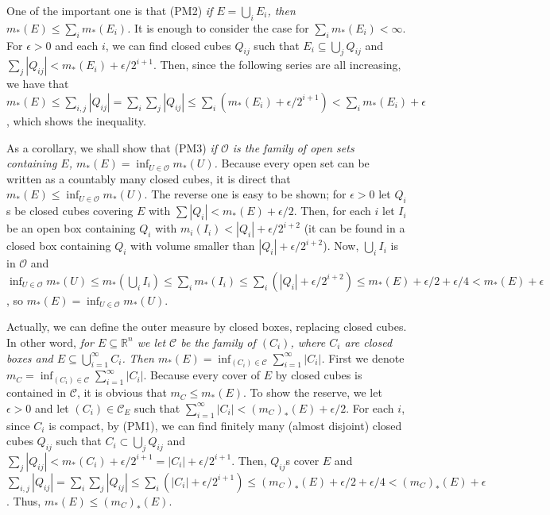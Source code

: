 \documentclass{article}
\newcommand{\ReR}{\mathbb{R}}
\begin{document}
One of the important one is that (PM2) \textit{if $E = \bigcup_i E_i$, then $m_*(E) \le \sum_i m_*(E_i)$.}
It is enough to consider the case for $\sum_i m_*(E_i) < \infty$.
For $\epsilon > 0$ and each $i$, we can find closed cubes $Q_{ij}$ such that $E_i \subseteq \bigcup_j Q_{ij}$ and $\sum_j |Q_{ij}| < m_*(E_i) + \epsilon / 2^{i + 1}$.
Then, since the following series are all increasing, we have that $m_*(E) \le \sum_{i, j} |Q_{ij}| = \sum_i \sum_j |Q_{ij}| \le \sum_i (m_*(E_i) + \epsilon / 2^{i + 1}) < \sum_i m_*(E_i) + \epsilon$, which shows the inequality.

As a corollary, we shall show that (PM3) \textit{if $\mathcal{O}$ is the family of open sets containing $E$, $m_*(E) = \inf_{U \in \mathcal{O}} m_*(U)$.}
Because every open set can be written as a countably many closed cubes, it is direct that $m_*(E) \le \inf_{U \in \mathcal{O}} m_*(U)$.
The reverse one is easy to be shown; for $\epsilon > 0$ let $Q_i$s be closed cubes covering $E$ with $\sum |Q_i| < m_*(E) + \epsilon / 2$.
Then, for each $i$ let $I_i$ be an open box containing $Q_i$ with $m_i(I_i) < |Q_i| + \epsilon / 2^{i + 2}$ (it can be found in a closed box containing $Q_i$ with volume smaller than $|Q_i| + \epsilon / 2^{i + 2}$).
Now, $\bigcup_i I_i$ is in $\mathcal{O}$ and $\inf_{U \in \mathcal{O}} m_*(U) \le m_*(\bigcup_i I_i) \le \sum_i m_*(I_i) \le \sum_i (|Q_i| + \epsilon / 2^{i + 2}) \le m_*(E) + \epsilon / 2 + \epsilon / 4 < m_*(E) + \epsilon$, so $m_*(E) = \inf_{U \in \mathcal{O}} m_*(U)$.

Actually, we can define the outer measure by closed boxes, replacing closed cubes.
In other word, \textit{for $E \subseteq \ReR^n$ we let $\mathcal{C}$ be the family of $(C_i)$, where $C_i$ are closed boxes and $E \subseteq \bigcup_{i = 1}^\infty C_i$.}
\textit{Then $m_*(E) = \inf_{(C_i) \in \mathcal{C}} \sum_{i = 1}^\infty |C_i|$.}
First we denote $m_C = \inf_{(C_i) \in \mathcal{C}} \sum_{i = 1}^\infty |C_i|$.
Because every cover of $E$ by closed cubes is contained in $\mathcal{C}$, it is obvious that $m_C \le m_*(E)$.
To show the reserve, we let $\epsilon > 0$ and let $(C_i) \in \mathcal{C}_E$ such that $\sum_{i = 1}^\infty |C_i| < (m_C)_*(E) + \epsilon / 2$.
For each $i$, since $C_i$ is compact, by (PM1), we can find finitely many (almost disjoint) closed cubes $Q_{ij}$ such that $C_i \subset \bigcup_j Q_{ij}$ and $\sum_{j} |Q_{ij}| < m_*(C_i) + \epsilon / 2^{i + 1} = |C_i| + \epsilon / 2^{i + 1}$.
Then, $Q_{ij}$s cover $E$ and $\sum_{i, j} |Q_{ij}| = \sum_{i} \sum_{j} |Q_{ij}| \le \sum_i ( |C_i| + \epsilon / 2^{i + 1} ) \le (m_C)_*(E) + \epsilon / 2 + \epsilon / 4 < (m_C)_*(E) + \epsilon$.
Thus, $m_*(E) \le (m_C)_*(E)$.
\end{document}
